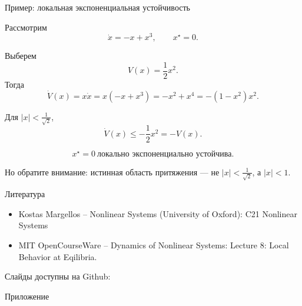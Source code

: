 \documentclass{beamer}
\newcommand{\myqrframe}{
	\begin{frame}
		\centerline{Слайды доступны на Github:}
		\bigskip
		\centerline{\mygit}
		\bigskip
		\myqr
	\end{frame}
}
\begin{document}
	
	\begin{frame}{Пример: локальная экспоненциальная устойчивость}
		\begin{flushleft}
			Рассмотрим
			\[
			\dot{x}=-x+x^3,
			\qquad x^\star=0.
			\]
			
			Выберем
			\[
			V(x)=\frac{1}{2}x^2.
			\]
			Тогда
			\[
			\dot V(x)
			=
			x \dot x
			=
			x(-x+x^3)
			=
			-x^2+x^4
			=
			-(1-x^2)x^2.
			\]
			
			Для \(|x|<\frac{1}{\sqrt{2}}\),
			\[
			\dot V(x)\leq-\frac{1}{2}x^2=-V(x).
			\]
			
			\[
			\boxed{x^\star=0\ \text{локально экспоненциально устойчива}.}
			\]
			
			Но обратите внимание: истинная область притяжения — не \(|x|<\frac{1}{\sqrt{2}}\), а \(|x|<1\).
			
		\end{flushleft}
	\end{frame}
	
	
	
	
	
	
	
	\begin{frame}{Литература}
		
		\begin{itemize}
			
			\item Kostas Margellos -- Nonlinear Systems (University of Oxford): 
			{C21 Nonlinear Systems}
			
			
			\item MIT OpenCourseWare -- Dynamics of Nonlinear Systems: 
			{Lecture 8: Local Behavior at Eqilibria.}
			
			
			
		\end{itemize}
		
	\end{frame}
	
	
	
	\myqrframe
	
	
	
	\begin{frame}
		
		{\Large Приложение}
		
	\end{frame}
	
\end{document}
